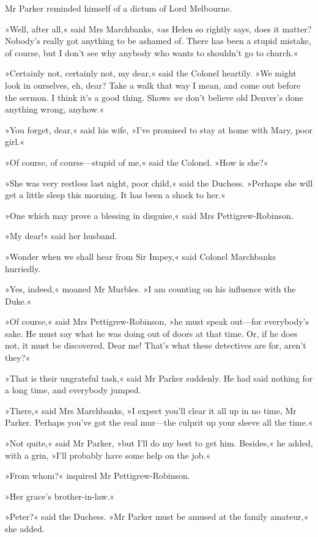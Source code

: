 Mr Parker reminded himself of a dictum of Lord Melbourne.

»Well, after all,« said Mrs Marchbanks, »as Helen so rightly says, does it matter? Nobody's really got anything to be ashamed of. There has been a stupid mistake, of course, but I don't see why anybody who wants to shouldn't go to church.«

»Certainly not, certainly not, my dear,« said the Colonel heartily. »We might look in ourselves, eh, dear? Take a walk that way I mean, and come out before the sermon. I think it's a good thing. Shows \textit{we} don't believe old Denver's done anything wrong, anyhow.«

»You forget, dear,« said his wife, »I've promised to stay at home with Mary, poor girl.«

»Of course, of course—stupid of me,« said the Colonel. »How is she?«

»She was very restless last night, poor child,« said the Duchess.  »Perhaps she will get a little sleep this morning. It has been a shock to her.«

»One which may prove a blessing in disguise,« said Mrs  Pettigrew-Robinson.

»My dear!« said her husband.

»Wonder when we shall hear from Sir Impey,« said Colonel Marchbanks hurriedly.

»Yes, indeed,« moaned Mr Murbles. »I am counting on his influence with the Duke.«

»Of course,« said Mrs Pettigrew-Robinson, »he must speak out—for everybody's sake. He must say what he was doing out of doors at that time. Or, if he does not, it must be discovered. Dear me! That's what these detectives are for, aren't they?«

»That is their ungrateful task,« said Mr Parker suddenly. He had said nothing for a long time, and everybody jumped.

»There,« said Mrs Marchbanks, »I expect you'll clear it all up in no time, Mr Parker. Perhaps you've got the real mur—the culprit up your sleeve all the time.«

»Not quite,« said Mr Parker, »but I'll do my best to get him.  Besides,« he added, with a grin, »I'll probably have some help on the job.«

»From whom?« inquired Mr Pettigrew-Robinson.

»Her grace's brother-in-law.«

»Peter?« said the Duchess. »Mr Parker must be amused at the family amateur,« she added.

